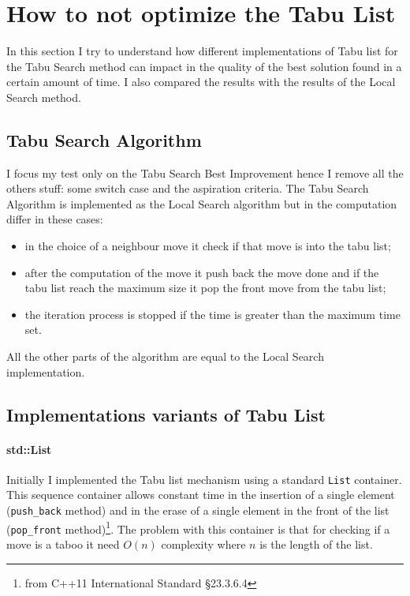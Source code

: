 
\section{How to not optimize the Tabu List}
	In this section I try to understand how different implementations of Tabu list for the Tabu Search method can impact in the quality of the best solution found in a certain amount of time. I also compared the results with the results of the Local Search method.

\subsection{Tabu Search Algorithm}
	I focus my test only on the Tabu Search Best Improvement hence I remove all the others stuff: some switch case and the aspiration criteria.
	The Tabu Search Algorithm is implemented as the Local Search algorithm but in the computation differ in these cases:
	\begin{itemize}
		\item in the choice of a neighbour move it check if that move is into the tabu list;
		\item after the computation of the move it push back the move done and if the tabu list reach the maximum size it pop the front move from the tabu list;
		\item the iteration process is stopped if the time is greater than the maximum time set.
	\end{itemize}
	All the other parts of the algorithm are equal to the Local Search implementation.
	
	
	

	\subsection{Implementations variants of Tabu List}
		
		\paragraph{std::List} Initially I implemented the Tabu list mechanism using a standard \verb|List| container. This sequence container allows constant time in the insertion of a single element (\verb|push_back| method) and in the erase of a single element in the front of the list (\verb|pop_front| method)\footnote{from C++11 International Standard §23.3.6.4}.
		The problem with this container is that for checking if a move is a taboo it need $O(n)$ complexity where $n$ is the length of the list.
		
